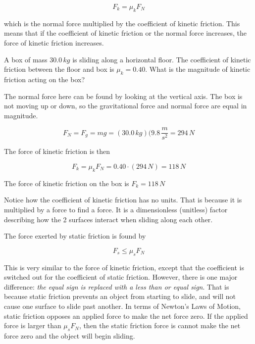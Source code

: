 \documentclass[12pt]{book}
\begin{document}
\begin{equation}
F_k = \mu_k F_N
\label{kfriction}
\end{equation}

which is the normal force multiplied by the coefficient of kinetic friction. This means that if the coefficient of kinetic friction or the normal force increases, the force of kinetic friction increases.

\begin{exampleblock}

A box of mass $30.0 \, kg$ is sliding along a horizontal floor. The coefficient of kinetic friction between the floor and box is $\mu_k = 0.40$. What is the magnitude of kinetic friction acting on the box?

\hspace{10pt}

The normal force here can be found by looking at the vertical axis. The box is not moving up or down, so the gravitational force and normal force are equal in magnitude.

\begin{equation}
F_N = F_g = mg = (30.0 \, kg)(9.8 \, \frac{m}{s^2} = 294 \, N
\end{equation}

The force of kinetic friction is then

\begin{equation}
F_k = \mu_k F_N = 0.40 \cdot (294 \, N) = 118 \, N
\end{equation}

The force of kinetic friction on the box is $F_k = 118 \, N$

\end{exampleblock}

Notice how the coefficient of kinetic friction has no units. That is because it is multiplied by a force to find a force. It is a dimensionless (unitless) factor describing how the 2 surfaces interact when sliding along each other.

The force exerted by static friction is found by

\begin{equation}
F_s \leq \mu_s F_N
\label{sfriction}
\end{equation}

This is very similar to the force of kinetic friction, except that the coefficient is switched out for the coefficient of static friction. However, there is one major difference: \textit{the equal sign is replaced with a less than or equal sign}. That is because static friction prevents an object from starting to slide, and will not cause one surface to slide past another. In terms of Newton's Laws of Motion, static friction opposes an applied force to make the net force zero. If the applied force is larger than $\mu_s F_N$, then the static friction force is cannot make the net force zero and the object will begin sliding. 
\end{document}
